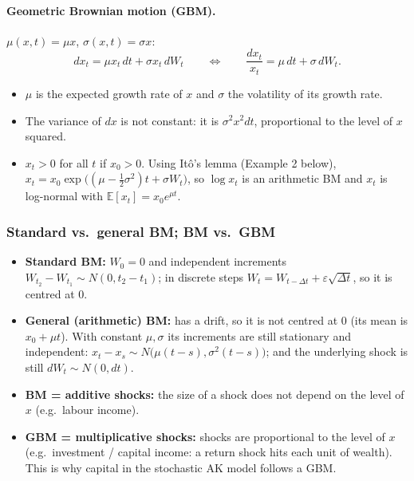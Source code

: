 \paragraph{Geometric Brownian motion (GBM).} $\mu(x,t)=\mu x$, $\sigma(x,t)=\sigma x$:
\begin{equation}\label{eq:gbm}
dx_t=\mu x_t\,dt+\sigma x_t\,dW_t\qquad\Longleftrightarrow\qquad \frac{dx_t}{x_t}=\mu\,dt+\sigma\,dW_t.
\end{equation}
\begin{itemize}
\item $\mu$ is the expected growth rate of $x$ and $\sigma$ the volatility of its growth rate.
\item The variance of $dx$ is not constant: it is $\sigma^2x^2dt$, proportional to the level of $x$ squared.
\item $x_t>0$ for all $t$ if $x_0>0$. Using It\^o's lemma (Example 2 below), $x_t=x_0\exp\!\big((\mu-\tfrac12\sigma^2)t+\sigma W_t\big)$, so $\log x_t$ is an arithmetic BM and $x_t$ is log-normal with $\mathbb{E}[x_t]=x_0e^{\mu t}$.
\end{itemize}

\subsubsection{Standard vs.\ general BM; BM vs.\ GBM}
\begin{itemize}
\item \textbf{Standard BM:} $W_0=0$ and independent increments $W_{t_2}-W_{t_1}\sim N(0,t_2-t_1)$; in discrete steps $W_t=W_{t-\Delta t}+\varepsilon\sqrt{\Delta t}$, so it is centred at 0.
\item \textbf{General (arithmetic) BM:} has a drift, so it is not centred at 0 (its mean is $x_0+\mu t$). With constant $\mu,\sigma$ its increments are still stationary and independent: $x_t-x_s\sim N\big(\mu(t-s),\sigma^2(t-s)\big)$; and the underlying shock is still $dW_t\sim N(0,dt)$.
\item \textbf{BM = additive shocks:} the size of a shock does not depend on the level of $x$ (e.g.\ labour income).
\item \textbf{GBM = multiplicative shocks:} shocks are proportional to the level of $x$ (e.g.\ investment / capital income: a return shock hits each unit of wealth). This is why capital in the stochastic AK model follows a GBM.
\end{itemize}

